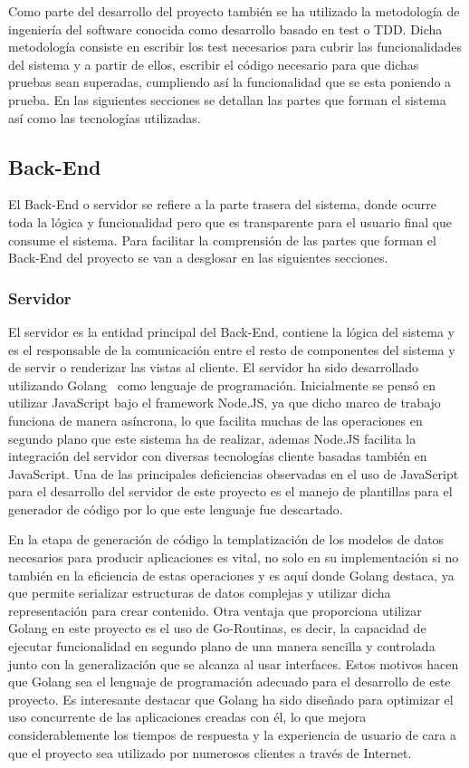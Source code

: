 \documentclass[a4paper,11pt]{book}
\begin{document}
Como parte del desarrollo del proyecto también se ha utilizado la metodología de ingeniería del software conocida como desarrollo basado en test o TDD. Dicha metodología consiste en escribir los test necesarios para cubrir las funcionalidades del sistema y a partir de ellos, escribir el código necesario para que dichas pruebas sean superadas, cumpliendo así la funcionalidad que se esta poniendo a prueba.  En las siguientes secciones se detallan las partes que forman el sistema así como las tecnologías utilizadas. 

\subsection{Back-End}

El Back-End o servidor se refiere a la parte trasera del sistema, donde ocurre toda la lógica y funcionalidad pero que es transparente para el usuario final que consume el sistema. Para facilitar la comprensión de las partes que forman  el Back-End del proyecto se van a desglosar en las siguientes secciones.

\subsubsection{Servidor}

El servidor es la entidad principal del Back-End, contiene la lógica del sistema y es el responsable de la comunicación entre el resto de componentes del sistema y de servir o renderizar las vistas al cliente.
El servidor ha sido desarrollado utilizando Golang~\cite{go} como lenguaje de programación. Inicialmente se pensó en utilizar JavaScript bajo el framework Node.JS, ya que dicho marco de trabajo funciona de manera asíncrona, lo que facilita muchas de las operaciones en segundo plano que este sistema ha de realizar, ademas Node.JS facilita la integración del servidor con diversas tecnologías cliente basadas también en JavaScript. Una de las principales deficiencias  observadas en el uso de JavaScript para el desarrollo del servidor de este proyecto es el manejo de plantillas para el generador de código por lo que este lenguaje fue descartado.

En la etapa de generación de código la templatización de los modelos de datos necesarios para producir aplicaciones es vital, no solo en su implementación si no también en la eficiencia de estas operaciones y es aquí donde Golang destaca, ya que permite serializar estructuras de datos complejas y utilizar dicha representación para crear contenido. Otra ventaja que proporciona utilizar Golang en este proyecto es el uso de Go-Routinas, es decir, la capacidad de ejecutar funcionalidad en segundo plano de una manera sencilla y controlada junto con la generalización que se alcanza al usar interfaces. Estos motivos hacen que Golang sea el lenguaje de programación adecuado para el desarrollo de este proyecto.  Es interesante destacar que Golang ha sido diseñado para optimizar el uso concurrente de las aplicaciones creadas con él, lo que mejora considerablemente los tiempos de respuesta y la experiencia de usuario de cara a que el proyecto sea utilizado por numerosos clientes a través de Internet.
\end{document}
